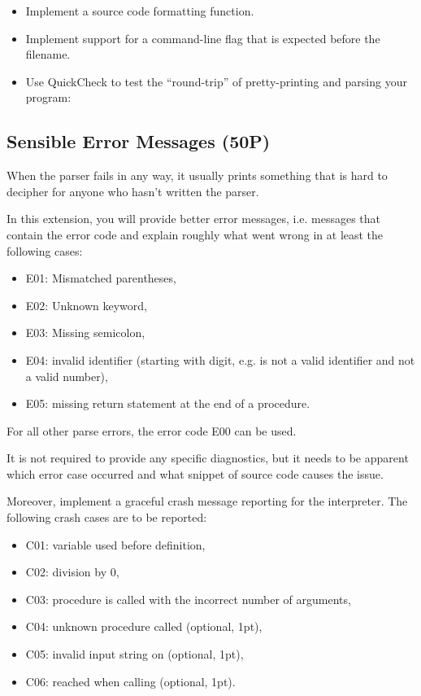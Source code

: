 \documentclass{article}
\begin{document}
\begin{itemize}
\item Implement a source code formatting function.
\item Implement support for a command-line flag  that is expected before the filename.
\item Use QuickCheck to test the ``round-trip'' of pretty-printing and parsing your program: 
\end{itemize}

\subsection{Sensible Error Messages (50P)}

When the parser fails in any way, it usually prints something that is hard to decipher for anyone who hasn't written the parser.

In this extension, you will provide better error messages, i.e. messages that contain the error code and explain roughly what went wrong in at least the following cases:

\begin{itemize}
\item E01: Mismatched parentheses,
\item E02: Unknown keyword,
\item E03: Missing semicolon,
\item E04: invalid identifier (starting with digit, e.g.  is not a valid identifier and not a valid number),
\item E05: missing return statement at the end of a procedure.
\end{itemize}

For all other parse errors, the error code E00 can be used.

It is not required to provide any specific diagnostics, but it needs to be apparent which error case occurred and what snippet of source code causes the issue.

Moreover, implement a graceful crash message reporting for the interpreter. The following crash cases are to be reported:

\begin{itemize}
\item C01: variable used before definition,
\item C02: division by 0,
\item C03: procedure is called with the incorrect number of arguments,
\item C04: unknown procedure called (optional, 1pt),
\item C05: invalid input string on  (optional, 1pt),
\item C06:  reached when calling  (optional, 1pt).
\end{itemize}
\end{document}
